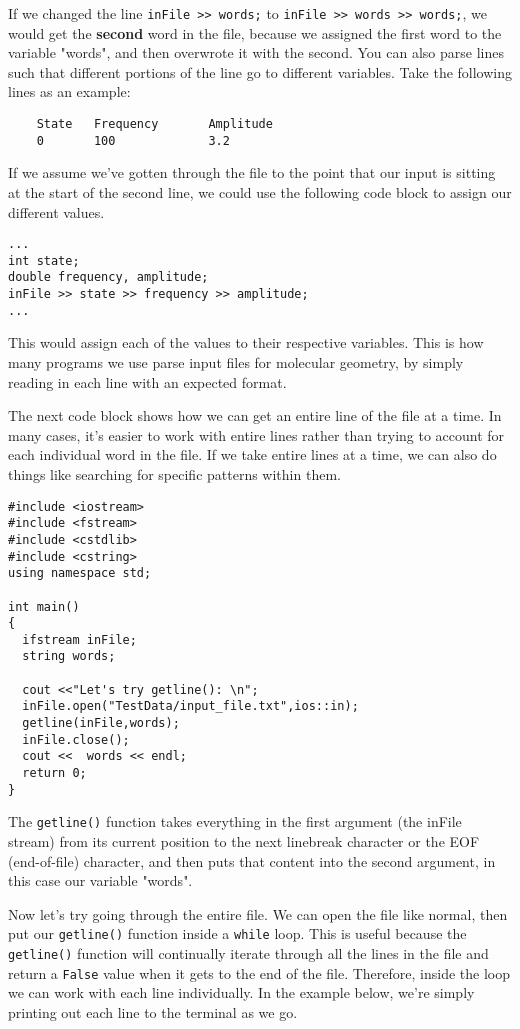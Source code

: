 If we changed the line \texttt{inFile >> words;} to \texttt{inFile >> words >> words;}, we would get the \textbf{second} word in the file, because we assigned the first word to the variable "words", and then overwrote it with the second.  You can also parse lines such that different portions of the line go to different variables.  Take the following lines as an example:

\begin{verbatim}
    State   Frequency       Amplitude
    0       100             3.2
\end{verbatim}

If we assume we've gotten through the file to the point that our input is sitting at the start of the second line, we could use the following code block to assign our different values.

\begin{verbatim}
...
int state;
double frequency, amplitude;
inFile >> state >> frequency >> amplitude;
...
\end{verbatim}

This would assign each of the values to their respective variables.  This is how many programs we use parse input files for molecular geometry, by simply reading in each line with an expected format.

The next code block shows how we can get an entire line of the file at a time.  In many cases, it's easier to work with entire lines rather than trying to account for each individual word in the file.  If we take entire lines at a time, we can also do things like searching for specific patterns within them.

\begin{verbatim}
#include <iostream>
#include <fstream>
#include <cstdlib>
#include <cstring>
using namespace std;

int main()
{
  ifstream inFile;
  string words;
 
  cout <<"Let's try getline(): \n";
  inFile.open("TestData/input_file.txt",ios::in);
  getline(inFile,words);
  inFile.close();
  cout <<  words << endl;
  return 0;
}
\end{verbatim}

The \texttt{getline()} function takes everything in the first argument (the inFile stream) from its current position to the next linebreak character or the EOF (end-of-file) character, and then puts that content into the second argument, in this case our variable "words".

Now let's try going through the entire file.  We can open the file like normal, then put our \texttt{getline()} function inside a \texttt{while} loop.  This is useful because the \texttt{getline()} function will continually iterate through all the lines in the file and return a \texttt{False} value when it gets to the end of the file.  Therefore, inside the loop we can work with each line individually.  In the example below, we're simply printing out each line to the terminal as we go.

